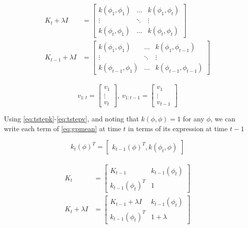 \documentclass{amsart}
\begin{document}
\begin{align}
\begin{split}
    K_t+\lambda I &= 
    \begin{bmatrix}
        k(\phi_1,\phi_1)&\hdots&k(\phi_1,\phi_t) \\
        \vdots & \ddots & \vdots \\
        k(\phi_t,\phi_1)&\hdots&k(\phi_t,\phi_t)
    \end{bmatrix}
    \\
    K_{t-1}+\lambda I &= 
    \begin{bmatrix}
        k(\phi_1,\phi_1)&\hdots&k(\phi_1,\phi_{t-1}) \\
        \vdots & \ddots & \vdots \\
        k(\phi_{t-1},\phi_1)&\hdots&k(\phi_{t-1},\phi_{t-1})
    \end{bmatrix}
    \label{eq:tstepK}
\end{split}
\end{align}

\begin{equation}
    v_{1:t} = 
    \begin{bmatrix}
        v_1 \\
        \vdots \\
        v_t
    \end{bmatrix}
    ,\ 
    v_{1:t-1} = 
    \begin{bmatrix}
        v_1 \\
        \vdots \\
        v_{t-1}
    \end{bmatrix}
    \label{eq:tstepv}
\end{equation}
\smallskip

Using \eqref{eq:tstepk}-\eqref{eq:tstepv}, and noting that $k(\phi,\phi)=1$ for any $\phi$, we can write each term of \eqref{eq:gpmean} at time $t$ in terms of its expression at time $t-1$

\begin{equation}
    k_t(\phi)^T=
    \begin{bmatrix}
        k_{t-1}(\phi)^T, k(\phi_t,\phi)
    \end{bmatrix}
\end{equation}

\begin{align}
\begin{split}
    K_t &=
    \begin{bmatrix}
        K_{t-1} & k_{t-1}(\phi_t) \\
        k_{t-1}(\phi_t)^T & 1
    \end{bmatrix}
    \\
    K_t+\lambda I &=
    \begin{bmatrix}
        K_{t-1}+\lambda I & k_{t-1}(\phi_t) \\
        k_{t-1}(\phi_t)^T & 1 + \lambda
    \end{bmatrix}
\end{split}
\end{align}
\end{document}
